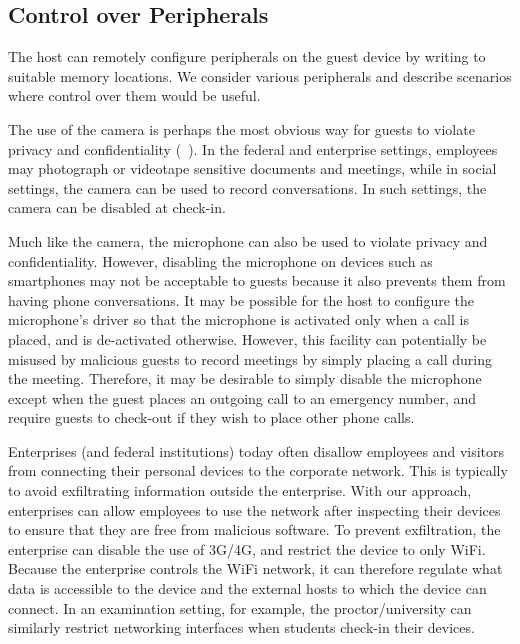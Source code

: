 \subsection{Control over Peripherals}
\label{section:policy:control}

The host can remotely configure peripherals on the guest device by writing to
suitable memory locations. We consider various peripherals and describe
scenarios where control over them would be useful.
 
 The use of the camera is perhaps the most obvious way for
guests to violate privacy and confidentiality
(\eg~\cite{placeraider:ndss13,placeavoider:ndss14}). In the federal and
enterprise settings, employees may photograph or videotape sensitive documents
and meetings, while in social settings, the camera can be used to record
conversations. In such settings, the camera can be disabled at check-in.

 Much like the camera, the microphone can also be used
to violate privacy and confidentiality. However, disabling the microphone on
devices such as smartphones may not be acceptable to guests because it also
prevents them from having phone conversations. It may be possible for the host
to configure the microphone's driver so that the microphone is activated only
when a call is placed, and is de-activated otherwise. However, this facility
can potentially be misused by malicious guests to record meetings by simply
placing a call during the meeting. Therefore, it may be desirable to simply
disable the microphone except when the guest places an outgoing call to an
emergency number, and require guests to check-out if they wish to place other
phone calls.

 Enterprises (and federal institutions) today often
disallow employees and visitors from connecting their personal devices to the
corporate network. This is typically to avoid exfiltrating information outside
the enterprise. With our approach, enterprises can allow employees to use the
network after inspecting their devices to ensure that they are free from
malicious software. To prevent exfiltration, the enterprise can disable the use
of 3G/4G, and restrict the device to only WiFi. Because the enterprise controls
the WiFi network, it can therefore regulate what data is accessible to the
device and the external hosts to which the device can connect. In an
examination setting, for example, the proctor/university can similarly restrict
networking interfaces when students check-in their devices.

